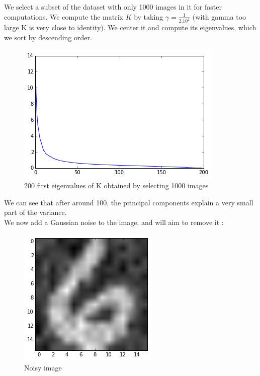 \documentclass[11pt,a4paper]{article}
\begin{document}
We select a subset of the dataset with only 1000 images in it for faster computations. We compute the matrix $K$ by taking $\gamma = \frac{1}{2.10^2}$ (with gamma too large K is very close to identity). We center it and compute its eigenvalues, which we sort by descending order.
\begin{figure}[H]
	\centering
	\noindent\includegraphics[scale=0.7]{lambdas.png}
	\caption{200 first eigenvalues of K obtained by selecting 1000 images}
\end{figure}
We can see that after around 100, the principal components explain a very small part of the variance.
%
\\[5mm]We now add a Gaussian noise to the image, and will aim to remove it :
\begin{figure}[H]
	\centering
	\noindent\includegraphics[scale=0.7]{noisy.png}
	\caption{Noisy image}
\end{figure}
\end{document}
